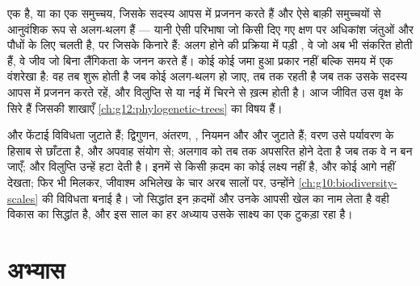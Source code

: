 \begin{proposition}[जाति, दोबारा सोची गई]\label{prop:g12:selection-drift-speciation:concept}
 एक  है, या  का एक समुच्चय, जिसके सदस्य आपस में प्रजनन
करते हैं और ऐसे बाक़ी समुच्चयों से आनुवंशिक रूप से अलग-थलग हैं --- यानी ऐसी
परिभाषा जो किसी दिए गए क्षण पर अधिकांश जंतुओं और पौधों के लिए चलती है, पर
जिसके किनारे हैं: अलग होने की प्रक्रिया में पड़ी , वे  जो अब
भी संकरित होती हैं, वे जीव जो बिना लैंगिकता के जनन करते हैं। कोई  कोई
जमा हुआ प्रकार नहीं बल्कि समय में एक वंशरेखा है: वह तब शुरू होती है जब कोई
 अलग-थलग हो जाए, तब तक रहती है जब तक उसके सदस्य आपस में प्रजनन करते
रहें, और विलुप्ति से या नई  में चिरने से ख़त्म होती है। आज जीवित
 उस वृक्ष के सिरे हैं जिसकी शाखाएँ
\cref{ch:g12:phylogenetic-trees} का विषय हैं।
\end{proposition}
\admitted

\begin{remark}[विकास, जोड़कर देखा गया]\label{rem:g12:selection-drift-speciation:assembled}
 और फेंटाई विविधता जुटाते हैं; द्विगुणन, अंतरण, , नियमन
और  और जुटाते हैं; वरण उसे पर्यावरण के हिसाब से छाँटता है, और अपवाह
संयोग से; अलगाव  को तब तक अपसरित होने देता है जब तक वे  न बन
जाएँ; और विलुप्ति उन्हें हटा देती है। इनमें से किसी क़दम का कोई लक्ष्य नहीं
है, और कोई आगे नहीं देखता; फिर भी मिलकर, जीवाश्म अभिलेख के चार अरब सालों
पर, उन्होंने \cref{ch:g10:biodiversity-scales} की विविधता बनाई है। जो
सिद्धांत इन क़दमों और उनके आपसी खेल का नाम लेता है वही विकास का सिद्धांत
है, और इस साल का हर अध्याय उसके साक्ष्य का एक टुकड़ा रहा है।
\end{remark}

\section{अभ्यास}

